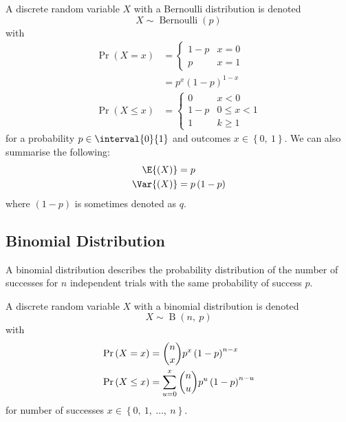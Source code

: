 \documentclass{article}
\begin{document}
A discrete random variable \(X\) with a Bernoulli distribution is denoted
\begin{equation*}
    X \sim \operatorname{Bernoulli}{\left( p \right)}
\end{equation*}
with
\begin{align*}
    \Pr{\left( X = x \right)}    & = \begin{cases}
                                         1 - p & x = 0 \\
                                         p     & x = 1
                                     \end{cases}                    \\
                                 & = p^x \left( 1 - p \right)^{1 - x} \\
    \Pr{\left( X \leq x \right)} & = \begin{cases}
                                         0     & x < 0        \\
                                         1 - p & 0 \leq x < 1 \\
                                         1     & k \geq 1
                                     \end{cases}
\end{align*}
for a probability \(p \in \interval{0}{1}\) and outcomes \(x \in \left\{ 0,\: 1 \right\}\).
We can also summarise the following:
\begin{align*}
    \E{\left( X \right)}   & = p                      \\
    \Var{\left( X \right)} & = p \left( 1 - p \right)
\end{align*}
where \(\left( 1 - p \right)\) is sometimes denoted as \(q\).
\subsection{Binomial Distribution}
A binomial distribution describes the probability distribution of the number of successes
for \(n\) independent trials with the same probability of success \(p\).

A discrete random variable \(X\) with a binomial distribution is denoted
\begin{equation*}
    X \sim \operatorname{B}{\left( n,\: p \right)}
\end{equation*}
with
\begin{align*}
    \Pr{\left( X = x \right)}    & = \dbinom{n}{x} p^x \left( 1 - p \right)^{n - x}                \\
    \Pr{\left( X \leq x \right)} & = \sum_{u = 0}^x \dbinom{n}{u} p^u \left( 1 - p \right)^{n - u}
\end{align*}
for number of successes \(x \in \left\{ 0,\: 1,\: \dots,\: n \right\}\).
\end{document}

